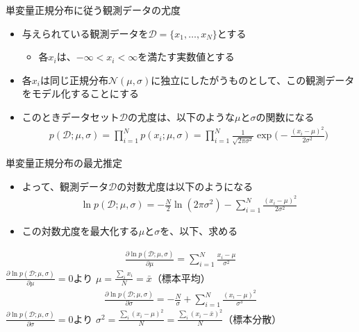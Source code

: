\documentclass[aspectratio=169,unicode,dvipdfmx,14pt]{beamer}
\begin{document}
\begin{frame}{単変量正規分布に従う観測データの尤度}
\begin{itemize}
\item 与えられている観測データを$\mathcal{D}=\{x_1,\ldots,x_N\}$とする
\begin{itemize}
\item 各$x_i$は、$-\infty < x_i < \infty$を満たす実数値とする
\end{itemize}
\item 各$x_i$は同じ正規分布$\mathcal{N}(\mu,\sigma)$に独立にしたがうものとして、この観測データをモデル化することにする
\item このときデータセット$\mathcal{D}$の尤度は、以下のような$\mu$と$\sigma$の関数になる
\begin{align}
p(\mathcal{D};\mu,\sigma)=\prod_{i=1}^N p(x_i;\mu,\sigma)
=\prod_{i=1}^N \frac{1}{\sqrt{2\pi\sigma^2}}\exp\bigg( - \frac{(x_i - \mu)^2}{2\sigma^2}\bigg)
\end{align}
\end{itemize}
\end{frame}


\begin{frame}{単変量正規分布の最尤推定}
\begin{itemize}
\item よって、観測データ$\mathcal{D}$の対数尤度は以下のようになる
\begin{align}
\ln p(\mathcal{D};\mu,\sigma)
= -\frac{N}{2}\ln(2\pi\sigma^2) - \sum_{i=1}^N \frac{(x_i - \mu)^2}{2\sigma^2}
\end{align}
\item この対数尤度を最大化する$\mu$と$\sigma$を、以下、求める
\end{itemize}
\end{frame}


\begin{frame}
\begin{align}
\frac{\partial \ln p(\mathcal{D};\mu,\sigma)}{\partial \mu}
= \sum_{i=1}^N \frac{x_i - \mu}{\sigma^2}
\end{align}
$\frac{\partial \ln p(\mathcal{D};\mu,\sigma)}{\partial \mu}=0$より
$\mu = \frac{\sum_i x_i}{N} = \bar{x}$（標本平均）
\begin{align}
\frac{\partial \ln p(\mathcal{D};\mu,\sigma)}{\partial \sigma}
= - \frac{N}{\sigma} + \sum_{i=1}^N \frac{(x_i - \mu)^2}{\sigma^3}
\end{align}
$\frac{\partial \ln p(\mathcal{D};\mu,\sigma)}{\partial \sigma} = 0$より
$\sigma^2 = \frac{\sum_i (x_i - \mu)^2}{N} = \frac{\sum_i (x_i - \bar{x})^2}{N}$（標本分散）
\end{frame}
\end{document}

